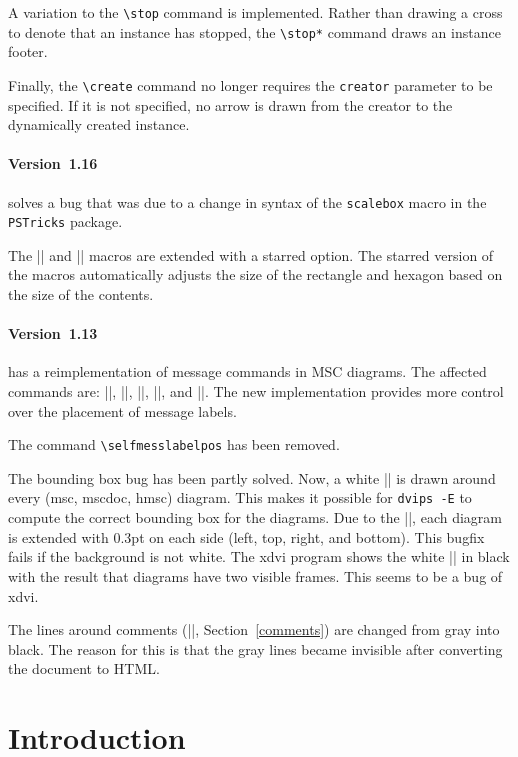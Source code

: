 \documentclass[12pt,a4paper]{article}
\begin{document}
A variation to the \verb+\stop+ command is implemented. Rather than
drawing a cross to denote that an instance has stopped, the
\verb+\stop*+ command draws an instance footer.

Finally, the \verb+\create+ command no longer requires the
\verb+creator+ parameter to be specified. If it is not specified, no
arrow is drawn from the creator to the dynamically created instance.


\paragraph{Version~1.16} solves a bug that was due to a change in
syntax of the \verb+scalebox+ macro in the  \verb+PSTricks+ package.

The |\action| and |\condition| macros are extended with a
starred option. The starred version of the macros automatically
adjusts the size of the rectangle and hexagon based on the size of the
contents.

\paragraph{Version~1.13} has a reimplementation of message commands in MSC
diagrams. The affected commands are: |\create|, |\found|,
|\lost|, |\mess|, and |\order|. The new implementation
provides more control over the placement of message labels.

The command \verb+\selfmesslabelpos+ has been removed.

The bounding box bug has been partly solved. Now, a white |\fbox|
is drawn around every (msc, mscdoc, hmsc) diagram. This makes it
possible for \texttt{dvips -E} to compute the correct bounding box for
the diagrams. Due to the |\fbox|, each diagram is extended with
0.3pt on each side (left, top, right, and bottom). This bugfix fails
if the background is not white. The xdvi program shows the white
|\fbox| in black with the result that diagrams have two visible
frames. This seems to be a bug of xdvi.

The lines around comments (|\msccomment|, Section~\ref{comments})
are changed from gray into black. The reason for this is that the gray
lines became invisible after converting the document to HTML.

\section{Introduction}
\label{introduction}
\end{document}
